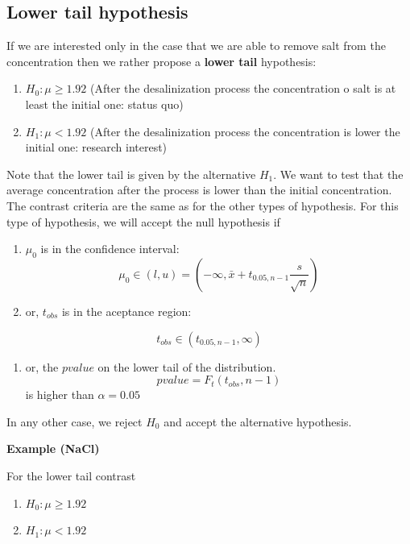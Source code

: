 \documentclass[
]{book}
\providecommand{\tightlist}{%
  \setlength{\itemsep}{0pt}\setlength{\parskip}{0pt}}
\begin{document}
\hypertarget{lower-tail-hypothesis}{%
\subsection{Lower tail hypothesis}\label{lower-tail-hypothesis}}

If we are interested only in the case that we are able to remove salt from the concentration then we rather propose a \textbf{lower tail} hypothesis:

\begin{enumerate}
\def\labelenumi{\alph{enumi}.}
\tightlist
\item
  \(H_0:\mu \geq 1.92\) (After the desalinization process the concentration o salt is at least the initial one: status quo)
\item
  \(H_1:\mu < 1.92\) (After the desalinization process the concentration is lower the initial one: research interest)
\end{enumerate}

Note that the lower tail is given by the alternative \(H_1\). We want to test that the average concentration after the process is lower than the initial concentration. The contrast criteria are the same as for the other types of hypothesis. For this type of hypothesis, we will accept the null hypothesis if

\begin{enumerate}
\def\labelenumi{\arabic{enumi}.}
\item
  \(\mu_0\) is in the confidence interval:
  \[\mu_0\in (l,u)=(-\infty, \bar{x}+t_{0.05,n-1} \frac{s}{\sqrt{n}})\]
\item
  or, \(t_{obs}\) is in the aceptance region:
\end{enumerate}

\[t_{obs}\in (t_{0.05,n-1}, \infty)\]

\begin{enumerate}
\def\labelenumi{\arabic{enumi}.}
\setcounter{enumi}{2}
\tightlist
\item
  or, the \(pvalue\) on the lower tail of the distribution.\\
  \[pvalue=F_t(t_{obs},n-1)\]
  is higher than \(\alpha=0.05\)
\end{enumerate}

In any other case, we reject \(H_0\) and accept the alternative hypothesis.

\textbf{Example (NaCl)}

For the lower tail contrast

\begin{enumerate}
\def\labelenumi{\alph{enumi}.}
\tightlist
\item
  \(H_0:\mu \geq 1.92\)
\item
  \(H_1:\mu < 1.92\)
\end{enumerate}
\end{document}
